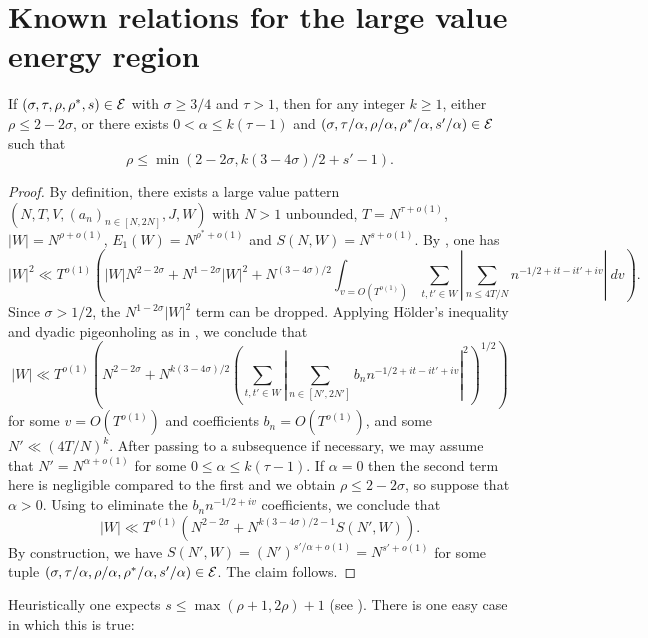\section{Known relations for the large value energy region}

\begin{theorem}\label{reflect}\cite[\S 11.5]{ivic} If $(\sigma,\tau,\rho,\rho^*,s) \in \mathcal{E}$ with $\sigma \geq 3/4$ and $\tau>1$, then for any integer $k \geq 1$, either $\rho \leq 2-2\sigma$, or there exists $0 < \alpha \leq k(\tau-1)$ and $(\sigma, \tau/\alpha, \rho/\alpha, \rho^*/\alpha, s'/\alpha) \in \mathcal{E}$ such that
$$ \rho \leq \min( 2-2\sigma, k(3-4\sigma)/2 + s' - 1).$$
\end{theorem}

\begin{proof} By definition, there exists a large value pattern $(N,T,V,(a_n)_{n \in [N,2N]},J,W)$ with $N>1$ unbounded, $T = N^{\tau+o(1)}$, $|W| = N^{\rho+o(1)}$, $E_1(W) = N^{\rho^*+o(1)}$ and $S(N,W) = N^{s+o(1)}$.  By \cite[(11.58)]{ivic}, one has
$$ |W|^2 \ll T^{o(1)} \left( |W| N^{2-2\sigma} + N^{1-2\sigma} |W|^2 + N^{(3-4\sigma)/2} \int_{v = O(T^{o(1)})} \sum_{t,t' \in W} \left|\sum_{n \leq 4T/N} n^{-1/2+it-it'+iv}\right|\ dv \right).$$
Since $\sigma>1/2$, the $N^{1-2\sigma} |W|^2$ term can be dropped.  Applying H\"older's inequality and dyadic pigeonholing as in \cite[(11.59)]{ivic}, we conclude that
$$ |W| \ll T^{o(1)} \left(N^{2-2\sigma} + N^{k(3-4\sigma)/2}  \left(\sum_{t,t' \in W} \left|\sum_{n \in [N',2N']} b_n n^{-1/2+it-it'+iv}\right|^2\right)^{1/2}\right)$$
for some $v = O(T^{o(1)})$ and coefficients $b_n = O(T^{o(1)})$, and some $N' \ll (4T/N)^k$.  After passing to a subsequence if necessary, we may assume that $N' = N^{\alpha+o(1)}$ for some $0 \leq \alpha \leq k(\tau-1)$.  If $\alpha=0$ then the second term here is negligible compared to the first and we obtain $\rho \leq 2-2\sigma$, so suppose that $\alpha > 0$.  Using \cite[Lemma 11.1]{ivic} to eliminate the $b_n n^{-1/2+iv}$ coefficients, we conclude that
$$ |W| \ll T^{o(1)} (N^{2-2\sigma} + N^{k(3-4\sigma)/2-1} S(N', W)).$$
By construction, we have $S(N',W) = (N')^{s'/\alpha+o(1)} = N^{s'+o(1)}$ for some tuple $(\sigma, \tau/\alpha, \rho/\alpha, \rho^*/\alpha, s'/\alpha) \in \mathcal{E}$.  The claim follows.
\end{proof}

Heuristically one expects $s \leq \max( \rho+1, 2\rho)+1$ (see \cite[(11.63)]{ivic}).  There is one easy case in which this is true:

